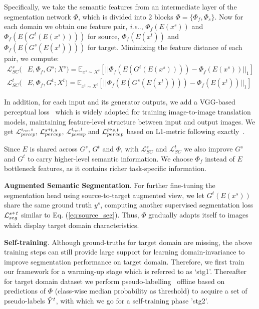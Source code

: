 \documentclass{bmvc2k}
\makeatletter
\DeclareRobustCommand\onedot{\futurelet\@let@token\@onedot}
\def\@onedot{\ifx\@let@token.\else.\null\fi\xspace}
\def\ie{\emph{i.e}\onedot} \def\Ie{\emph{I.e}\onedot}
\newcommand{\Eq}[1]{Eq. (\ref{eq:#1})}
\newcommand{\veryshortarrow}[1][3pt]{\mathrel{\hbox{\rule[\dimexpr\fontdimen22\textfont2-.2pt\relax]{#1}{.4pt}}\mkern-4mu\hbox{\usefont{U}{lasy}{m}{n}\symbol{41}}}}
\makeatother
\begin{document}
Specifically, we take the semantic features from an intermediate layer of the segmentation network ${\Phi}$, which is divided into 2 blocks ${\Phi} = \{\Phi_f, \Phi_s\}$. Now for each domain we obtain one feature pair, \ie,
${{\Phi_f}({E(x^{s})})}$ and ${{\Phi_f}(E(G^{t}({E(x^{s})})))}$ for source, ${{\Phi_f}({E(x^{t})})}$ and ${{\Phi_f}(E(G^{s}({E(x^{t})})))}$ for target. 
Minimizing the feature distance of each pair, we compute:
\begin{align}
    \label{eq:SC}
    \mathcal{L}^{s}_{SC} ( &E, {\Phi_f}, G^{s}; {X}^{s}) = \mathbb{E}_{{x}^{s} \sim {X}^{s}}[|| {\Phi_f}(E(G^{t}({E(x^{s})}))) - {\Phi_f}({E(x^{s})})||_{1}]\\
    \mathcal{L}^{t}_{SC}( &E, {\Phi_f}, G^{t}; {X}^{t}) = \mathbb{E}_{{x}^{t} \sim {X}^{t}}[|| {\Phi_f}(E(G^{s}({E(x^{t})}))) - {\Phi_f}({E(x^{t})})||_{1}]
\end{align}

In addition, for each input and its generator outputs, we add a VGG-based perceptual loss~\cite{johnson2016perceptual} which is widely adopted for training image-to-image translation models, maintaining feature-level structure between input and output images. We get ${\mathcal{L}^{s_{rec}, s}_{percep}}$, ${\mathcal{L}^{s\veryshortarrow t,s}_{percep}}$, ${\mathcal{L}^{t_{rec}, t}_{percep}}$ and ${\mathcal{L}^{t\veryshortarrow s,t}_{percep}}$ based on L1-metric following exactly~\cite{johnson2016perceptual}.

Since ${E}$ is shared across ${G^{s}}$, ${G^{t}}$ and ${\Phi}$, with ${\mathcal{L}^{s}_{SC}}$ and ${\mathcal{L}^{t}_{SC}}$ we also improve ${G^{s}}$ and ${G^{t}}$ to carry higher-level semantic information. We choose ${{\Phi_f}}$ instead of ${E}$ bottleneck features, as it contains richer task-specific information. 



\noindent\textbf{Augmented Semantic Segmentation}.
For further fine-tuning the segmentation head using source-to-target augmented view, we let $G^{t}({E(x^{s})})$ share the same ground truth ${{y}^{s}}$, computing another supervised segmentation loss ${\mathcal{L}^{s\veryshortarrow\,t}_{seg}}$ similar to \Eq{source_seg}. Thus, ${\Phi}$ gradually adapts itself to images which display target domain characteristics.

\noindent\textbf{Self-training}.
Although ground-truths for target domain are missing, the above training steps can still provide large support for learning domain-invariance to improve segmentation performance on target domain. Therefore, we first train our framework for a warming-up stage which is referred to as `stg1'. Thereafter for target domain dataset we perform pseudo-labelling~\cite{li2019bidirectional} offline based on predictions of ${\Phi}$ (class-wise median probability as threshold) to acquire a set of pseudo-labels ${\Hat{{Y}}^{t}}$, with which we go for a self-training phase 'stg2'.
\end{document}
